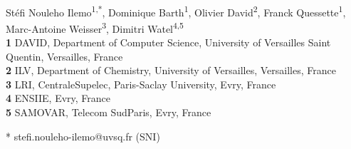 \documentclass[10pt,letterpaper]{article}
\begin{document}
\vspace*{0.2in}

\begin{flushleft}
{\Large
\textbf{} %
}
\newline
\\
Stéfi Nouleho Ilemo\textsuperscript{1,*},
Dominique Barth\textsuperscript{1},
Olivier David\textsuperscript{2},
Franck Quessette\textsuperscript{1},
Marc-Antoine Weisser\textsuperscript{3},
Dimitri Watel\textsuperscript{4,5}
\\
\bigskip
\textbf{1} DAVID, Department of Computer Science, University of Versailles Saint Quentin, Versailles, France
\\
\textbf{2} ILV, Department of Chemistry, University of Versailles, Versailles, France
\\
\textbf{3} LRI, CentraleSupelec, Paris-Saclay University, Evry, France
\\
\textbf{4} ENSIIE, Evry, France
\\
\textbf{5} SAMOVAR, Telecom SudParis, Evry, France
\\
\bigskip

% 
%





* stefi.nouleho-ilemo@uvsq.fr (SNI)

\end{flushleft}
\end{document}
